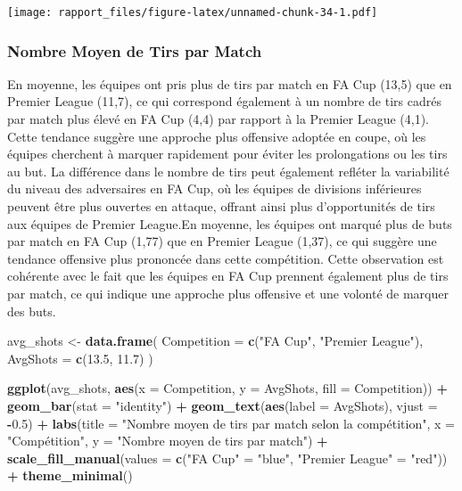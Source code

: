 \documentclass[
]{article}
\newenvironment{Shaded}{\begin{snugshade}}{\end{snugshade}}
\newcommand{\AttributeTok}[1]{\textcolor[rgb]{0.13,0.29,0.53}{#1}}
\newcommand{\FloatTok}[1]{\textcolor[rgb]{0.00,0.00,0.81}{#1}}
\newcommand{\FunctionTok}[1]{\textcolor[rgb]{0.13,0.29,0.53}{\textbf{#1}}}
\newcommand{\NormalTok}[1]{#1}
\newcommand{\OtherTok}[1]{\textcolor[rgb]{0.56,0.35,0.01}{#1}}
\newcommand{\SpecialCharTok}[1]{\textcolor[rgb]{0.81,0.36,0.00}{\textbf{#1}}}
\newcommand{\StringTok}[1]{\textcolor[rgb]{0.31,0.60,0.02}{#1}}
\begin{document}
\texttt{[image: rapport\_files/figure-latex/unnamed-chunk-34-1.pdf]}

\subsubsection{Nombre Moyen de Tirs par
Match}\label{nombre-moyen-de-tirs-par-match}

En moyenne, les équipes ont pris plus de tirs par match en FA Cup (13,5)
que en Premier League (11,7), ce qui correspond également à un nombre de
tirs cadrés par match plus élevé en FA Cup (4,4) par rapport à la
Premier League (4,1). Cette tendance suggère une approche plus offensive
adoptée en coupe, où les équipes cherchent à marquer rapidement pour
éviter les prolongations ou les tirs au but. La différence dans le
nombre de tirs peut également refléter la variabilité du niveau des
adversaires en FA Cup, où les équipes de divisions inférieures peuvent
être plus ouvertes en attaque, offrant ainsi plus d'opportunités de tirs
aux équipes de Premier League.En moyenne, les équipes ont marqué plus de
buts par match en FA Cup (1,77) que en Premier League (1,37), ce qui
suggère une tendance offensive plus prononcée dans cette compétition.
Cette observation est cohérente avec le fait que les équipes en FA Cup
prennent également plus de tirs par match, ce qui indique une approche
plus offensive et une volonté de marquer des buts.

\begin{Shaded}
\begin{Highlighting}[]
\NormalTok{avg\_shots }\OtherTok{\textless{}{-}} \FunctionTok{data.frame}\NormalTok{(}
  \AttributeTok{Competition =} \FunctionTok{c}\NormalTok{(}\StringTok{"FA Cup"}\NormalTok{, }\StringTok{"Premier League"}\NormalTok{),}
  \AttributeTok{AvgShots =} \FunctionTok{c}\NormalTok{(}\FloatTok{13.5}\NormalTok{, }\FloatTok{11.7}\NormalTok{)}
\NormalTok{)}

\FunctionTok{ggplot}\NormalTok{(avg\_shots, }\FunctionTok{aes}\NormalTok{(}\AttributeTok{x =}\NormalTok{ Competition, }\AttributeTok{y =}\NormalTok{ AvgShots, }\AttributeTok{fill =}\NormalTok{ Competition)) }\SpecialCharTok{+}
  \FunctionTok{geom\_bar}\NormalTok{(}\AttributeTok{stat =} \StringTok{"identity"}\NormalTok{) }\SpecialCharTok{+}
  \FunctionTok{geom\_text}\NormalTok{(}\FunctionTok{aes}\NormalTok{(}\AttributeTok{label =}\NormalTok{ AvgShots), }\AttributeTok{vjust =} \SpecialCharTok{{-}}\FloatTok{0.5}\NormalTok{) }\SpecialCharTok{+}
  \FunctionTok{labs}\NormalTok{(}\AttributeTok{title =} \StringTok{"Nombre moyen de tirs par match selon la compétition"}\NormalTok{,}
       \AttributeTok{x =} \StringTok{"Compétition"}\NormalTok{, }\AttributeTok{y =} \StringTok{"Nombre moyen de tirs par match"}\NormalTok{) }\SpecialCharTok{+}
  \FunctionTok{scale\_fill\_manual}\NormalTok{(}\AttributeTok{values =} \FunctionTok{c}\NormalTok{(}\StringTok{"FA Cup"} \OtherTok{=} \StringTok{"blue"}\NormalTok{, }\StringTok{"Premier League"} \OtherTok{=} \StringTok{"red"}\NormalTok{)) }\SpecialCharTok{+}
  \FunctionTok{theme\_minimal}\NormalTok{()}
\end{Highlighting}
\end{Shaded}
\end{document}
